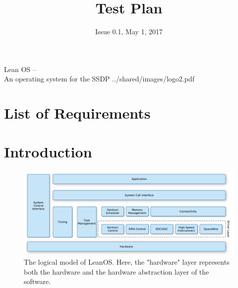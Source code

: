 

\title{Test Plan}
\def \documentid {LEANOS-UVIE-TP-001}
\date{Issue 0.1, May 1, 2017}

\newcommand\affil[1]{\textsuperscript#1}

\def\preparedby {Armin Luntzer\affil{1}}
\def\checkedby {Roland Ottensamer\affil{1}}
\def\approvedby {Franz Kerschbaum\affil{1}}

\def\affiliations{
	\affil{1} Department of Astrophysics, University of Vienna
}









\usepackage{vhistory}

\usepackage{biblatex}


\rereadauxrequirementlabels

\exportrequirements





\setmainfont{MyriadPro-SemiCondensed}
\uvietitlepage%
{Lean OS --\\ An operating system for the SSDP}%
{\doctitle}%
{../shared/images/logo2.pdf}
\setmainfont{MyriadPro}

\approvalpage

\tableofcontents
\newpage


\chapter*{List of Requirements}
\the\requirementlist


\begin{versionhistory}
\end{versionhistory}


\chapter{Introduction}

\begin{figure}[htb]
\begin{center}
	\includegraphics[width=\columnwidth]{../requirements/images/OS_logical}
	\caption{The logical model of LeanOS. Here, the "hardware" layer
	represents both the hardware and the hardware abstraction layer of
	the software.}
	\label{fig:logical_model}
\end{center}
\end{figure}


